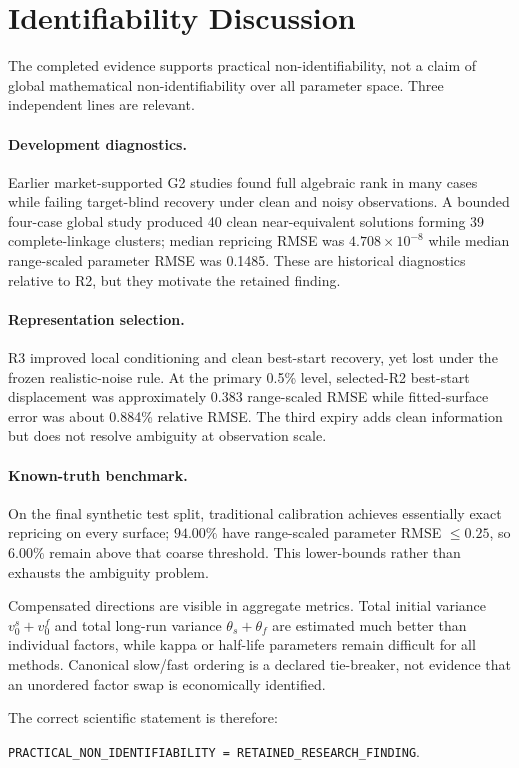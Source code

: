 \section{Identifiability Discussion}
\label{sec:identifiability}

The completed evidence supports practical non-identifiability, not a claim of global
mathematical non-identifiability over all parameter space. Three independent lines are
relevant.

\paragraph{Development diagnostics.}
Earlier market-supported G2 studies found full algebraic rank in many cases while
failing target-blind recovery under clean and noisy observations. A bounded four-case
global study produced 40 clean near-equivalent solutions forming 39 complete-linkage
clusters; median repricing RMSE was $4.708\times10^{-8}$ while median range-scaled
parameter RMSE was 0.1485. These are historical diagnostics relative to R2, but they
motivate the retained finding.

\paragraph{Representation selection.}
R3 improved local conditioning and clean best-start recovery, yet lost under the frozen
realistic-noise rule. At the primary 0.5\% level, selected-R2 best-start displacement
was approximately 0.383 range-scaled RMSE while fitted-surface error was about 0.884\%
relative RMSE. The third expiry adds clean information but does not resolve ambiguity
at observation scale.

\paragraph{Known-truth benchmark.}
On the final synthetic test split, traditional calibration achieves essentially exact
repricing on every surface; $94.00\%$ have range-scaled parameter RMSE $\leq0.25$, so
$6.00\%$ remain above that coarse threshold. This lower-bounds rather than exhausts the
ambiguity problem.

Compensated directions are visible in aggregate metrics. Total initial variance
$v^s_0+v^f_0$ and total long-run variance $\theta_s+\theta_f$ are estimated much better
than individual factors, while kappa or half-life parameters remain difficult for all
methods. Canonical slow/fast ordering is a declared tie-breaker, not evidence that an
unordered factor swap is economically identified.

The correct scientific statement is therefore:
\begin{center}
\texttt{PRACTICAL\_NON\_IDENTIFIABILITY = RETAINED\_RESEARCH\_FINDING}.
\end{center}
